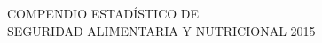 \begin{center}
\Bold \LARGE COMPENDIO ESTADÍSTICO DE\\
SEGURIDAD ALIMENTARIA Y NUTRICIONAL 2015
\end{center}
\cleardoublepage
\pagestyle{estandar}
%
%
%
%
%
%
%
%
%
%
%
%
%
%
%
%
%
%
%
%
%
%
%
